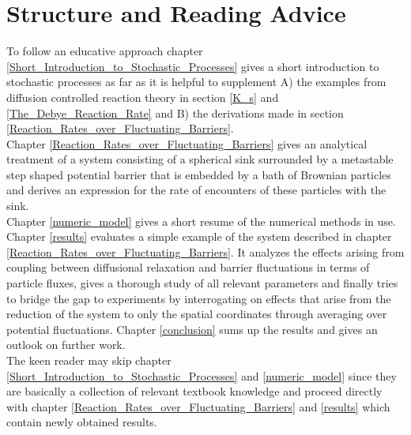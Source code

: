 \section{Structure and Reading Advice}
To follow an educative approach chapter \ref{Short_Introduction_to_Stochastic_Processes} gives a short introduction to stochastic processes as far as it is helpful to supplement A) the examples from diffusion controlled reaction theory in section \ref{K_s} and \ref{The_Debye_Reaction_Rate} and B) the derivations made in section \ref{Reaction_Rates_over_Fluctuating_Barriers}. \\
Chapter \ref{Reaction_Rates_over_Fluctuating_Barriers} gives an analytical treatment of a system consisting of a spherical sink surrounded by a metastable step shaped potential barrier that is embedded by a bath of Brownian particles and derives an expression for the rate of encounters of these particles with the sink. \\
Chapter \ref{numeric_model} gives a short resume of the numerical methods in use. Chapter \ref{results} evaluates a simple example of the system described in chapter \ref{Reaction_Rates_over_Fluctuating_Barriers}. It analyzes the effects arising from coupling between diffusional relaxation and barrier fluctuations in terms of particle fluxes, gives a thorough study of all relevant parameters and finally tries to bridge the gap to experiments by interrogating on effects that arise from the reduction of the system to only the spatial coordinates through averaging over potential fluctuations. Chapter \ref{conclusion} sums up the results and gives an outlook on further work. \\

The keen reader may skip chapter \ref{Short_Introduction_to_Stochastic_Processes} and \ref{numeric_model} since they are basically a collection of relevant textbook knowledge and proceed directly with chapter \ref{Reaction_Rates_over_Fluctuating_Barriers} and \ref{results} which contain newly obtained results. 
